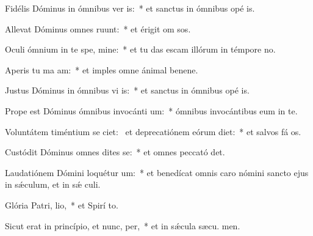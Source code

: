 \item Fidélis Dóminus in ómnibus ver is:~* et sanctus in ómnibus opé is.
\item Allevat Dóminus omnes  ruunt:~* et érigit om sos.
\item Oculi ómnium in te spe, mine:~* et tu das escam illórum in témpore no.
\item Aperis tu ma am:~* et imples omne ánimal benene.
\item Justus Dóminus in ómnibus vi is:~* et sanctus in ómnibus opé is.
\item Prope est Dóminus ómnibus invocánti um:~* ómnibus invocántibus eum in te.
\item Voluntátem timéntium se ciet:~\pscross{} et deprecatiónem eórum diet:~* et salvos fá os.
\item Custódit Dóminus omnes dites se:~* et omnes peccató det.
\item Laudatiónem Dómini loquétur  um:~* et benedícat omnis caro nómini sancto ejus in sǽculum, et in sǽ culi.
\item Glória Patri,  lio,~* et Spirí to.
\item Sicut erat in princípio, et nunc,  per,~* et in sǽcula sæcu. men.
